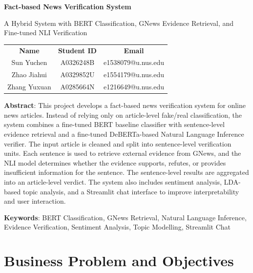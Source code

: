 \documentclass[11pt]{article}
\begin{document}

\begin{center}
    \vspace*{2in}
    {\LARGE \textbf{Fact-based News Verification System}\par}
    \vspace{0.15em}
    {\Large A Hybrid System with BERT Classification, GNews Evidence Retrieval, and Fine-tuned NLI Verification\par}

    \vspace{1in}

    \begin{tabularx}{\textwidth}{@{}CCC@{}}
        \textbf{Name} & \textbf{Student ID} & \textbf{Email} \\
        Sun Yuchen & A0326248B & e1538079@u.nus.edu \\
        Zhao Jiahui & A0329852U & e1554179@u.nus.edu \\
        Zhang Yuxuan & A0285664N & e1216649@u.nus.edu \\
    \end{tabularx}
\end{center}

\vspace{1in}

\noindent\textbf{Abstract}: This project develops a fact-based news verification system for online news articles. Instead of relying only on article-level fake/real classification, the system combines a fine-tuned BERT baseline classifier with sentence-level evidence retrieval and a fine-tuned DeBERTa-based Natural Language Inference verifier. The input article is cleaned and split into sentence-level verification units. Each sentence is used to retrieve external evidence from GNews, and the NLI model determines whether the evidence supports, refutes, or provides insufficient information for the sentence. The sentence-level results are aggregated into an article-level verdict. The system also includes sentiment analysis, LDA-based topic analysis, and a Streamlit chat interface to improve interpretability and user interaction.

\smallskip
\noindent\textbf{Keywords}: BERT Classification, GNews Retrieval, Natural Language Inference, Evidence Verification, Sentiment Analysis, Topic Modelling, Streamlit Chat


\newpage
\tableofcontents
\newpage
{}

\section{Business Problem and Objectives}
\end{document}
